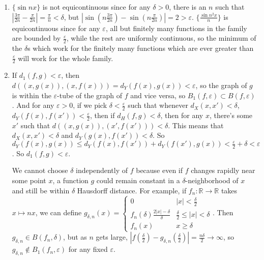 \documentclass{article}
\newcommand\RR{\mathbb R}
\begin{document}
\begin{enumerate}
   \item $\{\sin nx\}$ is not equicontinuous since for any $\delta>0$, there is
      an $n$ such that $|\frac{3\pi}{2n} - \frac{\pi}{2n}| = \frac\pi{n} <
      \delta$, but $|\sin(n\frac{3\pi}{2n}) - \sin(n\frac{\pi}{2n})| = 2 >
      \varepsilon$.  $\{\frac{\sin n^2x}n\}$ is equicontinuous since for any
      $\varepsilon$, all but finitely many functions in the family are bounded
      by $\frac\varepsilon2$, while the rest are uniformly continuous, so the
      minimum of the $\delta$s which work for the finitely many functions which
      are ever greater than $\frac\varepsilon2$ will work for the whole family.

   \item If $d_1(f,g) < \varepsilon$, then $d( (x,g(x)), (x,f(x))) =
      d_Y(f(x),g(x)) < \varepsilon$, so the graph of $g$ is within the
      $\varepsilon$-tube of the graph of $f$ and vice versa, so
      $B_1(f,\varepsilon) \subset B(f,\varepsilon)$. And for any
      $\varepsilon>0$, if we pick $\delta<\frac\varepsilon2$ such that whenever
      $d_X(x,x') < \delta$, $d_Y(f(x),f(x')) < \frac\varepsilon2$, then if
      $d_H(f,g) < \delta$, then for any $x$, there's some $x'$ such that $d(
      (x,g(x)), (x',f(x'))) < \delta$. This means that $d_X(x,x') < \delta$ and
      $d_Y(g(x),f(x')) < \delta$. So $d_Y(f(x),g(x)) \leq d_Y(f(x),f(x')) +
      d_Y(f(x'),g(x)) < \frac\varepsilon2 + \delta < \varepsilon$. So $d_1(f,g)
      < \varepsilon$.
      
      We cannot choose $\delta$ independently of $f$ because even if $f$ changes
      rapidly near some point $x$, a function $g$ could remain constant in a
      $\delta$-neighborhood of $x$ and still be within $\delta$ Hausdorff
      distance. For example, if $f_n : \RR \to \RR$ takes $x \mapsto nx$, we can
      define $g_{\delta,n}(x) = \begin{cases} 0 & |x| < \frac\delta2 \\
         f_n(\delta)\frac{2|x|-\delta}\delta & \frac\delta2 \leq |x| < \delta
         \\ f_n(x) & x \geq \delta \end{cases}$. Then $g_{\delta,n} \in
      B(f_n,\delta)$, but as $n$ gets large, $|f(\frac\delta2) -
      g_{\delta,n}(\frac\delta2)| = \frac{n\delta}2 \to \infty$, so
      $g_{\delta,n} \not\in B_1(f_n,\varepsilon)$ for any fixed $\varepsilon$.
\end{enumerate}
\end{document}
